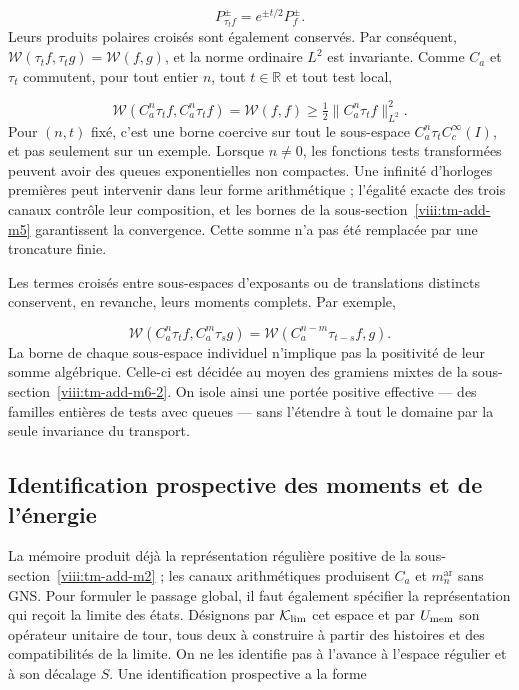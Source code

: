 \[
P_{\tau_t f}^{\pm}=e^{\pm t/2}P_f^{\pm}.
\]
Leurs produits polaires croisés sont également conservés. Par conséquent, \(\mathscr W(\tau_t f,\tau_t g)=\mathscr W(f,g)\), et la norme ordinaire \(L^2\) est invariante. Comme \(C_a\) et \(\tau_t\) commutent, pour tout entier \(n\), tout \(t\in\mathbb R\) et tout test local,

\[
\boxed{\mathscr W(C_a^n\tau_t f,C_a^n\tau_t f)
=\mathscr W(f,f)
\geq\tfrac12\|C_a^n\tau_t f\|_{L^2}^2.}
\]
Pour \((n,t)\) fixé, c'est une borne coercive sur tout le sous-espace \(C_a^n\tau_t C_c^\infty(I)\), et pas seulement sur un exemple. Lorsque \(n\ne0\), les fonctions tests transformées peuvent avoir des queues exponentielles non compactes. Une infinité d'horloges premières peut intervenir dans leur forme arithmétique ; l'égalité exacte des trois canaux contrôle leur composition, et les bornes de la sous-section~\ref{viii:tm-add-m5} garantissent la convergence. Cette somme n'a pas été remplacée par une troncature finie.

Les termes croisés entre sous-espaces d'exposants ou de translations distincts conservent, en revanche, leurs moments complets. Par exemple,

\[
\mathscr W(C_a^n\tau_t f,C_a^m\tau_s g)
=\mathscr W(C_a^{n-m}\tau_{t-s}f,g).
\]
La borne de chaque sous-espace individuel n'implique pas la positivité de leur somme algébrique. Celle-ci est décidée au moyen des gramiens mixtes de la sous-section~\ref{viii:tm-add-m6-2}. On isole ainsi une portée positive effective — des familles entières de tests avec queues — sans l'étendre à tout le domaine par la seule invariance du transport.


\subsection{Identification prospective des moments et de l'énergie}
\label{viii:tm-add-m7}
La mémoire produit déjà la représentation régulière positive de la sous-section~\ref{viii:tm-add-m2} ; les canaux arithmétiques produisent \(C_a\) et \(m_n^{\mathrm{ar}}\) sans GNS. Pour formuler le passage global, il faut également spécifier la représentation qui reçoit la limite des états. Désignons par \(\mathcal K_{\rm lim}\) cet espace et par \(U_{\rm mem}\) son opérateur unitaire de tour, tous deux à construire à partir des histoires et des compatibilités de la limite. On ne les identifie pas à l'avance à l'espace régulier et à son décalage \(S\). Une identification prospective a la forme

